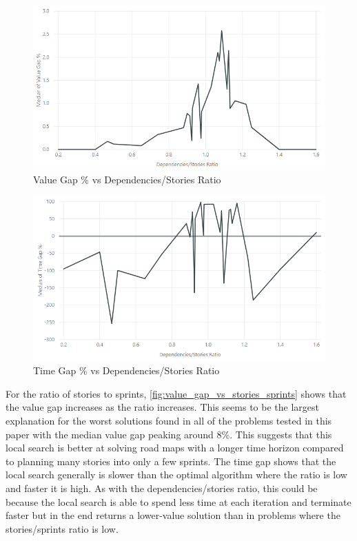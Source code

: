 \begin{figure}[h!]
    \centering
    \includegraphics[width=\textwidth]{Figures/Results/annealing_value_gap_dependencies_stories.png}
    \caption{Value Gap \% vs Dependencies/Stories Ratio}
    \label{fig:value_gap_vs_dependencies_stories}
\end{figure}

\begin{figure}[h!]
    \centering
    \includegraphics[width=\textwidth]{Figures/Results/annealing_time_gap_dependencies_stories.png}
    \caption{Time Gap \% vs Dependencies/Stories Ratio}
    \label{fig:time_gap_vs_dependencies_stories}
\end{figure}

For the ratio of stories to sprints, \cref{fig:value_gap_vs_stories_sprints} shows that the value gap increases as the ratio increases. This seems to be the largest explanation for the worst solutions found in all of the problems tested in this paper with the median value gap peaking around 8\%. This suggests that this local search is better at solving road maps with a longer time horizon compared to planning many stories into only a few sprints. The time gap shows that the local search generally is slower than the optimal algorithm where the ratio is low and faster it is high. As with the dependencies/stories ratio, this could be because the local search is able to spend less time at each iteration and terminate faster but in the end returns a lower-value solution than in problems where the stories/sprints ratio is low.

